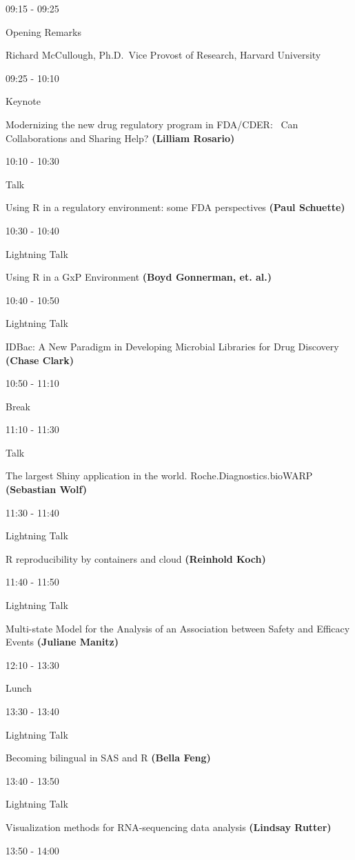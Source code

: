 \documentclass[]{book}
\theoremstyle{definition}
\theoremstyle{definition}
\theoremstyle{definition}
\theoremstyle{remark}
\begin{document}
09:15 - 09:25

Opening Remarks

Richard McCullough, Ph.D.~Vice Provost of Research, Harvard University

09:25 - 10:10

Keynote

Modernizing the new drug regulatory program in FDA/CDER:~ Can
Collaborations and Sharing Help? \textbf{(Lilliam Rosario)}

10:10 - 10:30

Talk

Using R in a regulatory environment: some FDA perspectives \textbf{(Paul
Schuette)}

10:30 - 10:40

Lightning Talk

Using R in a GxP Environment \textbf{(Boyd Gonnerman, et. al.)}

10:40 - 10:50

Lightning Talk

IDBac: A New Paradigm in Developing Microbial Libraries for Drug
Discovery \textbf{(Chase Clark)}

10:50 - 11:10

Break

11:10 - 11:30

Talk

The largest Shiny application in the world. Roche.Diagnostics.bioWARP
\textbf{(Sebastian Wolf)}

11:30 - 11:40

Lightning Talk

R reproducibility by containers and cloud \textbf{(Reinhold Koch)}

11:40 - 11:50

Lightning Talk

Multi-state Model for the Analysis of an Association between Safety and
Efficacy Events \textbf{(Juliane Manitz)}

12:10 - 13:30

Lunch

13:30 - 13:40

Lightning Talk

Becoming bilingual in SAS and R \textbf{(Bella Feng)}

13:40 - 13:50

Lightning Talk

Visualization methods for RNA-sequencing data analysis \textbf{(Lindsay
Rutter)}

13:50 - 14:00
\end{document}

